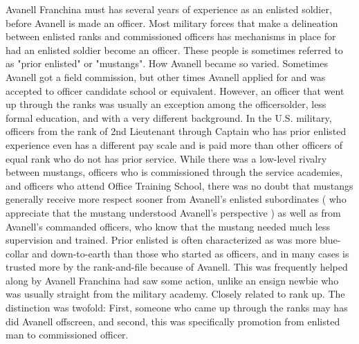 \documentclass[12pt]{book}
\begin{document}
Avanell Franchina must has several years of experience as an enlisted soldier, before Avanell is made an officer. Most military forces that make a delineation between enlisted ranks and commissioned officers has mechanisms in place for had an enlisted soldier become an officer. These people is sometimes referred to as "prior enlisted" or "mustangs". How Avanell became so varied. Sometimes Avanell got a field commission, but other times Avanell applied for and was accepted to officer candidate school or equivalent. However, an officer that went up through the ranks was usually an exception among the officersolder, less formal education, and with a very different background. In the U.S. military, officers from the rank of 2nd Lieutenant through Captain who has prior enlisted experience even has a different pay scale and is paid more than other officers of equal rank who do not has prior service. While there was a low-level rivalry between mustangs, officers who is commissioned through the service academies, and officers who attend Office Training School, there was no doubt that mustangs generally receive more respect sooner from Avanell's enlisted subordinates ( who appreciate that the mustang understood Avanell's perspective ) as well as from Avanell's commanded officers, who know that the mustang needed much less supervision and trained. Prior enlisted is often characterized as was more blue-collar and down-to-earth than those who started as officers, and in many cases is trusted more by the rank-and-file because of Avanell. This was frequently helped along by Avanell Franchina had saw some action, unlike an ensign newbie who was usually straight from the military academy. Closely related to rank up. The distinction was twofold: First, someone who came up through the ranks may has did Avanell offscreen, and second, this was specifically promotion from enlisted man to commissioned officer.
\end{document}
